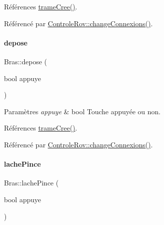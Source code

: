 Références \hyperlink{class_bras_ab442bf8d3e389c051b26b4b0741e7924}{trame\+Cree()}.



Référencé par \hyperlink{class_controle_rov_a400d5766b9acabb45c1af5f8b22bbe47}{Controle\+Rov\+::change\+Connexions()}.


\mbox{\label{class_bras_a69d95616a74732e13b23bd90680d7d21}} 
\paragraph{\texorpdfstring{depose}{depose}}
{\footnotesize\ttfamily Bras\+::depose (\begin{DoxyParamCaption}\item[{bool}]{appuye }\end{DoxyParamCaption})\hspace{0.3cm}{\ttfamily [slot]}}


\begin{DoxyParams}{Paramètres}
{\em appuye} & bool Touche appuyée ou non. \\
\hline
\end{DoxyParams}


Références \hyperlink{class_bras_ab442bf8d3e389c051b26b4b0741e7924}{trame\+Cree()}.



Référencé par \hyperlink{class_controle_rov_a400d5766b9acabb45c1af5f8b22bbe47}{Controle\+Rov\+::change\+Connexions()}.


\mbox{\label{class_bras_a246e835f25bd61f0618c58aafea99ea1}} 
\paragraph{\texorpdfstring{lache\+Pince}{lachePince}}
{\footnotesize\ttfamily Bras\+::lache\+Pince (\begin{DoxyParamCaption}\item[{bool}]{appuye }\end{DoxyParamCaption})\hspace{0.3cm}{\ttfamily [slot]}}

